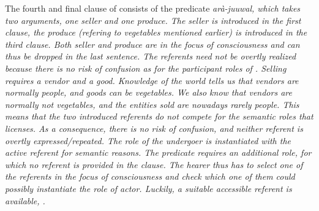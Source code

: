 The fourth and final clause of  consists of the predicate \em arà-juuwal\em, which takes two arguments, one seller and one produce. The seller  is introduced in the first clause, the produce (refering to vegetables mentioned earlier) is introduced in the third clause. Both seller and produce are in the focus of consciousness and can thus be dropped in the last sentence. The referents  need not be overtly realized because there is no risk of confusion as for the participant roles of .  Selling requires a vendor and a good. Knowledge of the world tells us that vendors are normally people, and goods can be vegetables. We also know that vendors are normally not vegetables, and the entities sold are nowadays rarely people. This means that the two introduced referents do not compete for the semantic roles that  licenses. As a consequence, there is no risk of confusion, and neither referent is overtly expressed/repeated. The role of the undergoer is instantiated with the active referent  for semantic reasons. The predicate requires an additional role, for which no referent is provided in the clause. The hearer thus has to select one of the  referents in the focus of consciousness and check which one of them could possibly instantiate the role of actor. Luckily, a suitable accessible referent is available, .


